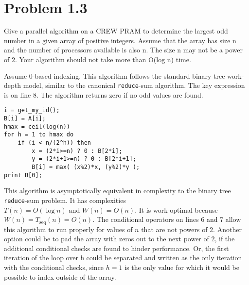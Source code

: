 \section*{Problem 1.3}
Give a parallel algorithm on a CREW PRAM to determine the largest odd number in a
given array of positive integers. Assume that the array has size n and the number of processors available
is also n. The size n may not be a power of 2. Your algorithm should not take more than O(log n) time.
\probline

Assume 0-based indexing. This algorithm follows the standard binary tree work-depth model, similar to the canonical \texttt{reduce}-sum algorithm. The key expression is on line 8. The algorithm returns zero if no odd values are found.
\begin{lstlisting}
i = get_my_id();
B[i] = A[i];
hmax = ceil(log(n))
for h = 1 to hmax do
	if (i < n/(2^h)) then
		x = (2*i>=n) ? 0 : B[2*i];
		y = (2*i+1>=n) ? 0 : B[2*i+1];
		B[i] = max( (x%2)*x, (y%2)*y );
print B[0];
\end{lstlisting}

This algorithm is asymptotically equivalent in complexity to the binary tree \texttt{reduce}-sum problem. It has complexities $\boxed{T(n) = O(\log n) \text{ and } W(n) = O(n)}$. It is work-optimal because $W(n) = T_{\text{seq}}(n) = O(n)$. The conditional operators on lines 6 and 7 allow this algorithm to run properly for values of $n$ that are not powers of 2. Another option could be to pad the array with zeros out to the next power of 2, if the additional conditional checks are found to hinder performance. Or, the first iteration of the loop over \texttt{h} could be separated and written as the only iteration with the conditional checks, since $h=1$ is the only value for which it would be possible to index outside of the array.

